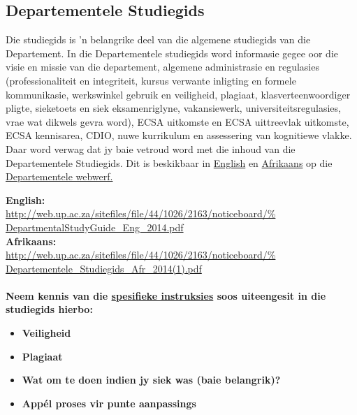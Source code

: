     \subsection{Departementele Studiegids}
    \label{sec:department}
    Die studiegids is 'n belangrike deel van die algemene studiegids
    van die Departement. In die Departementele studiegids word
    informasie gegee oor die visie en missie van die departement,
    algemene administrasie en regulasies (professionaliteit en
    integriteit, kursus verwante inligting en formele kommunikasie,
    werkswinkel gebruik en veiligheid, plagiaat, klasverteenwoordiger
    pligte, sieketoets en siek eksamenriglyne, vakansiewerk,
    universiteitsregulasies, vrae wat dikwels gevra word), ECSA
    uitkomste en ECSA uittreevlak uitkomste, ECSA kennisarea, CDIO,
    nuwe kurrikulum en assessering van kognitiewe vlakke.  Daar word
    verwag dat jy baie vetroud word met die inhoud van die
    Departementele Studiegids.  Dit is beskikbaar in 
\href{http://web.up.ac.za/sitefiles/file/44/1026/2163/noticeboard/%
        DepartmentalStudyGuide\_Eng\_2014.pdf}{English}
    en
    \href{http://web.up.ac.za/sitefiles/file/44/1026/2163/noticeboard/%
        Departementele\_Studiegids\_Afr\_2014(1).pdf}{Afrikaans}
    op die
    \href{http://web.up.ac.za/default.asp?ipkCategoryID=11426&%
        subid=11426&ipklookid=7}{Departementele webwerf.}

    \noindent
    \textbf{English:} \\
    \url{http://web.up.ac.za/sitefiles/file/44/1026/2163/noticeboard/%
      DepartmentalStudyGuide\_Eng\_2014.pdf} \\
    \textbf{Afrikaans:} \\
    \url{http://web.up.ac.za/sitefiles/file/44/1026/2163/noticeboard/%
      Departementele\_Studiegids\_Afr\_2014(1).pdf} \\~\\

    \noindent
    \textbf{Neem kennis van die \uline{spesifieke instruksies} soos
      uiteengesit in die studiegids hierbo:}
    \begin{itemize}
        \item \textbf{Veiligheid}
        \item \textbf{Plagiaat}
        \item \textbf{Wat om te doen indien jy siek was (baie belangrik)?}
        \item \textbf{App\'el proses vir punte aanpassings}
    \end{itemize}